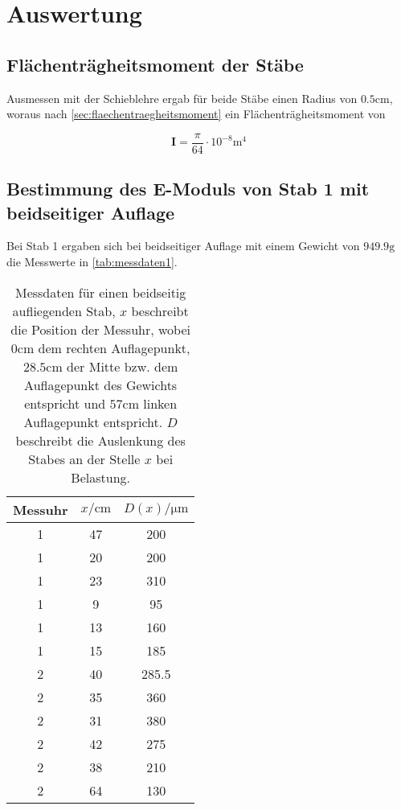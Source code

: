 \section{Auswertung}
\label{sec:Auswertung}
\subsection{Flächenträgheitsmoment der Stäbe}
Ausmessen mit der Schieblehre ergab für beide Stäbe einen Radius von 
$0.5\si{\centi\meter}$, woraus nach \autoref{sec:flaechentraegheitsmoment} ein
Flächenträgheitsmoment von

\begin{equation}
	\mathbf{I} 
	= \frac{\pi}{64} \cdot 10^{-8} \si{\m^4}
	\label{eqn:IWert}
\end{equation}

\subsection{Bestimmung des E-Moduls von Stab 1 mit beidseitiger Auflage}
\label{sec:messung1}
Bei Stab 1 ergaben sich bei beidseitiger Auflage mit einem Gewicht von $949.9 \si{\gram}$ 
die Messwerte in \autoref{tab:messdaten1}.

\begin{table}
	\centering
	\caption{Messdaten für einen beidseitig aufliegenden Stab, $x$ beschreibt
	die Position der Messuhr, wobei $0\si{\centi\meter}$
	dem rechten Auflagepunkt, $28.5\si{\centi\meter}$ der Mitte bzw. dem Auflagepunkt 
	des Gewichts entspricht und $57\si{\centi\meter}$ linken Auflagepunkt entspricht.
	$D$ beschreibt die Auslenkung des Stabes an der Stelle $x$ bei Belastung.}
	\label{tab:messdaten1}
	\begin{tabular}{c c c}
	\toprule
	Messuhr &
	$x / \si{\centi\meter}$ &
	$D(x) / \si{\micro\meter}$
	\\
	\midrule
	1 & 47 & 200 \\
	1 & 20 & 200 \\
	1 & 23 & 310 \\
	1 & 9 & 95 \\
	1 & 13 & 160 \\
	1 & 15 & 185 \\
	2 & 40 & 285.5 \\
	2 & 35 & 360 \\
	2 & 31 & 380 \\
	2 & 42 & 275 \\
	2 & 38 & 210 \\
	2 & 64 & 130 \\
	\bottomrule
\end{tabular}
\end{table}

